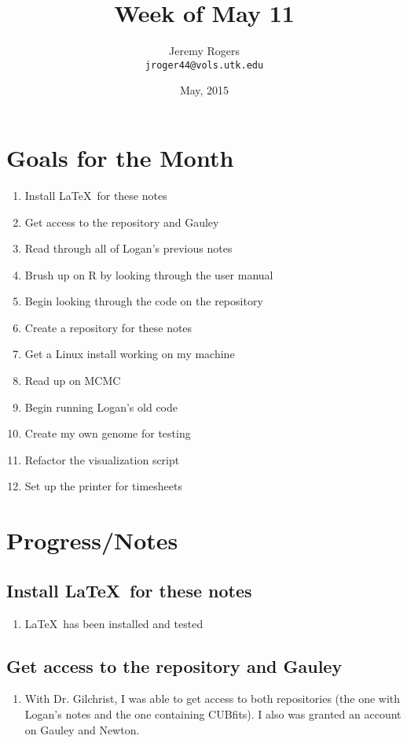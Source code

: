 \documentclass[12 pt]{article}
\title{Week of May 11}
\author{Jeremy Rogers \\
	\texttt{jroger44@vols.utk.edu}}
\date{May, 2015}
\begin{document}
	\maketitle
	
	\tableofcontents
	
	\section{Goals for the Month}
	\begin{enumerate}
		\item Install \LaTeX\ for these notes
		\item Get access to the repository and Gauley
		\item Read through all of Logan's previous notes
		\item Brush up on R by looking through the user manual
		\item Begin looking through the code on the repository
		\item Create a repository for these notes
		\item Get a Linux install working on my machine
		\item Read up on MCMC
		\item Begin running Logan's old code
		\item Create my own genome for testing
		\item Refactor the visualization script
		\item Set up the printer for timesheets
	\end{enumerate}
	
	\section{Progress/Notes}
	
	\subsection{Install \LaTeX\ for these notes}
		\begin{enumerate}
			\item \LaTeX\ has been installed and tested
		\end{enumerate}
	
	\subsection{Get access to the repository and Gauley}
		 \begin{enumerate}
		 	\item With Dr. Gilchrist, I was able to get access to both repositories (the one with Logan's notes and the one containing CUBfits). I also was granted an account on Gauley and Newton.
		 \end{enumerate}
\end{document}
